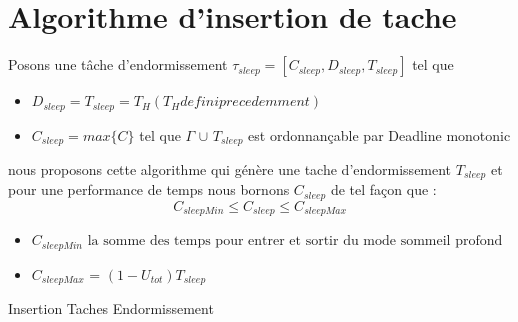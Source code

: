 \section{Algorithme d'insertion de tache} 
Posons une tâche d’endormissement $\tau_{sleep} =[C_{sleep},D_{sleep},T_{sleep}]$ tel que 
	 
	\begin{itemize}
	\item $D_{sleep} = T_{sleep} = T_{H} (T_{H} defini precedemment )$
	\item $C_{sleep} = max\{C\}$ tel que $\Gamma$ $\cup$ $T_{sleep}$ est ordonnançable par Deadline monotonic
	\end{itemize}
nous proposons cette algorithme qui génère une tache d'endormissement $T_{sleep}$ et pour une performance de temps nous  bornons $C_{sleep}$ de tel façon que : \\
\[ C_{sleepMin} \leq C_{sleep} \leq C_{sleepMax} \]
\begin{itemize}
\item $C_{sleepMin}$ $\text{la somme des temps pour entrer et sortir du mode sommeil profond}$
\item $C_{sleepMax}$  = $(1-U_{tot})T_{sleep}$
\end{itemize}
\begin{center}
\begin{algorithm}[H]
 \caption{Insertion Taches Endormissement}
\end{algorithm}
\end{center}